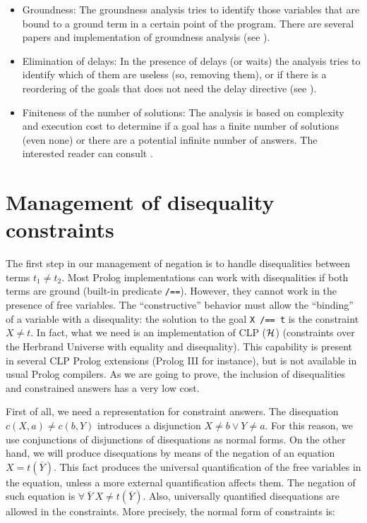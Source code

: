 \documentclass[]{llncs}
\begin{document}
\begin{itemize}
\item Groundness: The groundness analysis tries to identify those
variables that are bound to a ground term in a certain point
of the program. There are several papers and implementation of
groundness analysis (see \cite{GroundnessCIAO}).

\item Elimination of delays: In the presence of delays (or waits)
the analysis tries to identify which of them are useless (so,
removing them), or if there is a reordering of the goals that
does not need the delay directive (see \cite{DelayCIAO,Puebla}).

\item Finiteness of the number of solutions: The analysis is based
on complexity and execution cost to determine if a goal has a
finite number of solutions (even none) or there are a potential
infinite number of answers. The interested reader can consult
\cite{Lopez2,Braem}.
\end{itemize}


\vspace{-7pt}
\section{Management of disequality constraints}
\vspace{-7pt}

The first step in our management of negation is to handle
disequalities between terms $t_1 \neq t_2$. Most
Prolog implementations can work with disequalities if
both terms are ground (built-in predicate {\tt /==}).
However, they cannot work in the
presence of free variables. The ``constructive'' behavior
must allow the ``binding'' of a variable with a disequality:
the solution to the goal {\tt X /== t}
is the constraint $X \neq t$. In fact, what we need is
an implementation of CLP (${\cal H}$) (constraints over the Herbrand
Universe with equality and disequality). This capability is
present in several CLP Prolog extensions (Prolog III for instance),
but is not available in usual Prolog compilers. As we are
going to prove, the inclusion of disequalities and constrained
answers has a very low cost.

First of all, we need a representation for constraint answers. The
disequation $c (X, a) \neq c (b, Y)$ introduces a disjunction
$X \neq b \vee Y \neq a$. For this reason, we use conjunctions of
disjunctions of disequations as normal forms.  On the other
hand, we will produce disequations by means of the negation of
an equation $X = t (\overline{Y})$. This fact produces the
universal quantification of the free variables in the equation,
unless a more external quantification affects them. The
negation of such equation is $\forall~ \overline{Y}~X \neq t(\overline{Y})$.
Also, universally quantified disequations are allowed in
the constraints. More precisely, the normal form of
constraints is:
\end{document}
